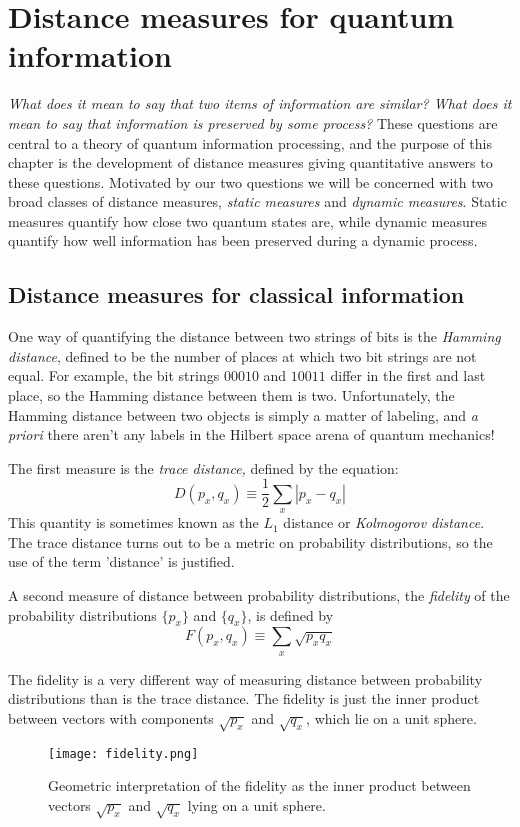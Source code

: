 \section{Distance measures for quantum information}
\textit{What does it mean to say that two items of information are similar? What does it mean to say that information is preserved by some process?} These questions are central to a theory of quantum information processing, and the purpose of this chapter is the development of distance measures giving quantitative answers to these questions. Motivated by our two questions we will be concerned with two broad classes of distance measures, \textit{static measures} and \textit{dynamic measures}. Static measures quantify how close two quantum states are, while dynamic measures quantify how well information has been preserved during a dynamic process.

\subsection{Distance measures for classical information}
One way of quantifying the distance between two strings of bits is the \textit{Hamming distance}, defined to be the number of places at which two bit strings are not equal. For example, the bit strings $00010$ and $10011$ differ in the first and last place, so the Hamming distance between them is two. Unfortunately, the Hamming distance between two objects is simply a matter of labeling, and \textit{a priori} there aren't any labels in the Hilbert space arena of quantum mechanics!
\vspace{1em}

The first measure is the \textit{trace distance,} defined by the equation:
$$D(p_x, q_x) \equiv \frac{1}{2}\sum_x{|p_x-q_x|}$$
This quantity is sometimes known as the $L_1$ distance or \textit{Kolmogorov distance}. The trace distance turns out to be a metric on probability distributions, so the use of the term 'distance' is justified.
\vspace{1em}

A second measure of distance between probability distributions, the \textit{fidelity} of the probability distributions $\{p_x\}$ and $\{q_x\}$, is defined by
$$F(p_x, q_x) \equiv \sum_x{\sqrt{p_x q_x}}$$

The fidelity is a very different way of measuring distance between probability distributions
than is the trace distance. The fidelity is just the inner product between vectors with components $\sqrt{p_x}$ and $\sqrt{q_x}$, which lie on a unit sphere.
\begin{figure}[h]
    \centering
    \texttt{[image: fidelity.png]}
    \caption{Geometric interpretation of the fidelity as the inner product between vectors $\sqrt{p_x}$ and $\sqrt{q_x}$ lying on a unit sphere.}
\end{figure}

